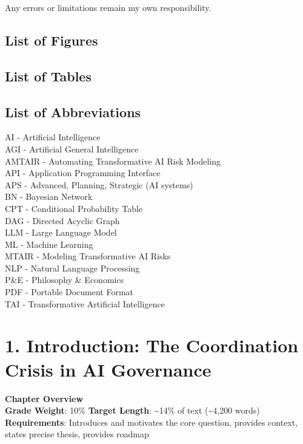 \documentclass[
  11pt,
  letterpaper,
]{book}
\begin{document}
Any errors or limitations remain my own responsibility.

\section{List of Figures}\label{list-of-figures}

\section{List of Tables}\label{list-of-tables}

\section{List of Abbreviations}\label{list-of-abbreviations-1}

AI - Artificial Intelligence\\
AGI - Artificial General Intelligence\\
AMTAIR - Automating Transformative AI Risk Modeling\\
API - Application Programming Interface\\
APS - Advanced, Planning, Strategic (AI systems)\\
BN - Bayesian Network\\
CPT - Conditional Probability Table\\
DAG - Directed Acyclic Graph\\
LLM - Large Language Model\\
ML - Machine Learning\\
MTAIR - Modeling Transformative AI Risks\\
NLP - Natural Language Processing\\
P\&E - Philosophy \& Economics\\
PDF - Portable Document Format\\
TAI - Transformative Artificial Intelligence


\chapter{1. Introduction: The Coordination Crisis in AI
Governance}\label{introduction-the-coordination-crisis-in-ai-governance}

\textbf{Chapter Overview}\\
\textbf{Grade Weight}: 10\% \textbar{} \textbf{Target Length}:
\textasciitilde14\% of text (\textasciitilde4,200 words)\\
\textbf{Requirements}: Introduces and motivates the core question,
provides context, states precise thesis, provides roadmap
\end{document}
